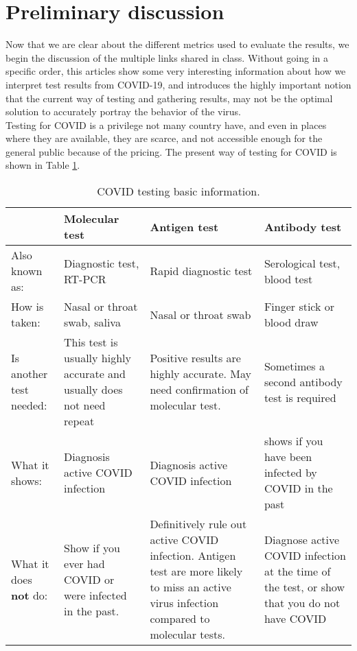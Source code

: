 \documentclass{article}
\begin{document}
\section{Preliminary discussion}

Now that we are clear about the different metrics used to evaluate the results, we begin the discussion of the multiple links shared in class. Without going in a specific order, this articles show some very interesting information about how we interpret test results from COVID-19, and introduces the highly important notion that the current way of testing and gathering results, may not be the optimal solution to accurately portray the behavior of the virus.\\

Testing for COVID is a privilege not many country have, and even in places where they are available, they are scarce, and not accessible enough for the general public because of the pricing. The present way of testing for COVID is shown in Table \ref{tab1}.\\

\begin{table}[]\caption{COVID testing basic information.}
\label{tab1}
\begin{tabular}{|p{2.7cm}|p{3.4cm}|p{3.4cm}|p{3.4cm}|}
\hline
     & Molecular test & Antigen test & Antibody test \\
\hline
Also known as: & Diagnostic test, RT-PCR& Rapid diagnostic test& Serological test, blood test\\
\hline
How is taken: & Nasal or throat swab, saliva&Nasal or throat swab& Finger stick or blood draw\\
\hline
Is another test needed: & This test is usually highly accurate and usually does not need repeat&Positive results are highly accurate. May need confirmation of molecular test.&Sometimes a second antibody test is required\\
\hline
What it shows: & Diagnosis active COVID infection & Diagnosis active COVID infection& shows if you have been infected by COVID in the past\\
\hline
What it does \textbf{not} do: & Show if you ever had COVID or were infected in the past. & Definitively rule out active COVID infection. Antigen test are more likely to miss an active virus infection compared to molecular tests.& Diagnose active COVID infection at the time of the test, or show that you do not have COVID\\
\hline
\end{tabular}
\end{table}
\end{document}

